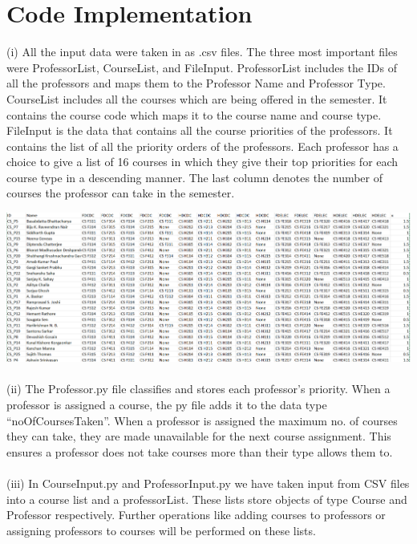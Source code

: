 \documentclass[a4paper,12pt]{article}
\begin{document}
\section{Code Implementation}

(i) All the input data were taken in as .csv files. The three most important files were ProfessorList, CourseList, and FileInput. ProfessorList includes the IDs of all the professors and maps them to the Professor Name and Professor Type. \\                                                        CourseList includes all the courses which are being offered in the semester. It contains the course code which maps it to the course name and course type.        \\   
FileInput is the data that contains all the course priorities of the professors. It contains the list of all the priority orders of the professors. Each professor has a choice to give a list of 16 courses in which they give their top priorities for each course type in a descending manner. The last column denotes the number of courses the professor can take in the semester. \\ 

\graphicspath{ {./images/} }
\includegraphics[width=\textwidth]{Data} \\ \\


(ii) The Professor.py file classifies and stores each professor’s priority. When a professor is assigned a course, the py file adds it to the data type “noOfCoursesTaken”. When a professor is assigned the maximum no. of courses they can take, they are made unavailable for the next course assignment. This ensures a professor does not take courses more than their type allows them to. \\ \\

(iii) In CourseInput.py and ProfessorInput.py we have taken input from CSV files into a course list and a professorList. These lists store objects of type Course and Professor respectively. Further operations like adding courses to professors or assigning professors to courses will be performed on these lists. \\ \\
\end{document}

